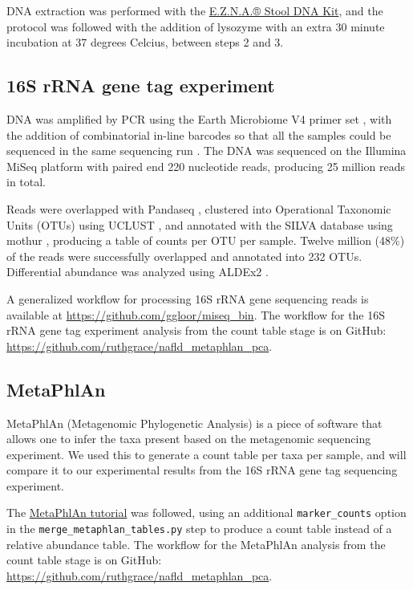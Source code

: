 DNA extraction was performed with the \href{http://omegabiotek.com/store/product/stool-dna-kit/}{E.Z.N.A.® Stool DNA Kit}, and the protocol was followed with the addition of lysozyme with an extra 30 minute incubation at 37 degrees Celcius, between steps 2 and 3.

\subsection{16S rRNA gene tag experiment}

DNA was amplified by PCR using the Earth Microbiome V4 primer set \cite{caporaso2012ultra}, with the addition of combinatorial in-line barcodes so that all the samples could be sequenced in the same sequencing run \cite{gloor2010microbiome}. The DNA was sequenced on the Illumina MiSeq platform with paired end 220 nucleotide reads, producing 25 million reads in total.

Reads were overlapped with Pandaseq \cite{masella2012pandaseq}, clustered into Operational Taxonomic Units (OTUs) using UCLUST \cite{edgar2010search}, and annotated with the SILVA database \cite{quast2013silva} using mothur \cite{schloss2009introducing}, producing a table of counts per OTU per sample. Twelve million (48\%) of the reads were successfully overlapped and annotated into 232 OTUs. Differential abundance was analyzed using ALDEx2 \cite{fernandes2014unifying}.

A generalized workflow for processing 16S rRNA gene sequencing reads is available at \url{https://github.com/ggloor/miseq_bin}. The workflow for the 16S rRNA gene tag experiment analysis from the count table stage is on GitHub: \url{https://github.com/ruthgrace/nafld_metaphlan_pca}.

\subsection{MetaPhlAn}

MetaPhlAn (Metagenomic Phylogenetic Analysis) \cite{segata2012metagenomic} is a piece of software that allows one to infer the taxa present based on the metagenomic sequencing experiment. We used this to generate a count table per taxa per sample, and will compare it to our experimental results from the 16S rRNA gene tag sequencing experiment.

The \href{https://bitbucket.org/nsegata/metaphlan/wiki/MetaPhlAn_Pipelines_Tutorial}{MetaPhlAn tutorial} was followed, using an additional \verb|marker_counts| option in the \verb|merge_metaphlan_tables.py| step to produce a count table instead of a relative abundance table. The workflow for the MetaPhlAn analysis from the count table stage is on GitHub: \url{https://github.com/ruthgrace/nafld_metaphlan_pca}.

